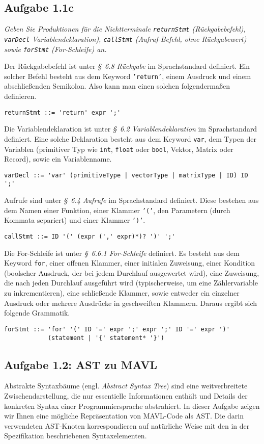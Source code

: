 \documentclass[
  ngerman,
  DIV=14
]{scrartcl}
\begin{document}
\subsection*{Aufgabe 1.1c}

\emph{Geben Sie Produktionen für die Nichtterminale \texttt{returnStmt} (Rückgabebefehl), \texttt{varDecl} Variablendeklaration), \texttt{callStmt} (Aufruf-Befehl, ohne Rückgabewert) sowie \texttt{forStmt} (For-Schleife) an.}

\bigskip\noindent
Der Rückgabebefehl ist unter \emph{§~6.8 Rückgabe} im Sprachstandard definiert. Ein solcher Befehl besteht aus dem Keyword \texttt{'return'}, einem Ausdruck und einem abschließenden Semikolon. Also kann man einen solchen folgendermaßen definieren.
\begin{lstlisting}
returnStmt ::= 'return' expr ';'
\end{lstlisting}
Die Variablendeklaration ist unter \emph{§~6.2 Variablendeklaration} im Sprachstandard definiert. Eine solche Deklaration besteht aus dem Keyword \texttt{var}, dem Typen der Variablen (primitiver Typ wie \texttt{int}, \texttt{float} oder \texttt{bool}, Vektor, Matrix oder Record), sowie ein Variablenname.
\begin{lstlisting}
varDecl ::= 'var' (primitiveType | vectorType | matrixType | ID) ID ';'  
\end{lstlisting}
Aufrufe sind unter \emph{§~6.4 Aufrufe} im Sprachstandard definiert. Diese bestehen aus dem Namen einer Funktion, einer Klammer \texttt{'('}, den Parametern (durch Kommata separiert) und einer Klammer \texttt{')'}.
\begin{lstlisting}
callStmt ::= ID '(' (expr (',' expr)*)? ')' ';'
\end{lstlisting}
Die For-Schleife ist unter \emph{§~6.6.1 For-Schleife} definiert. Es besteht aus dem Keyword \texttt{for}, einer offenen Klammer, einer initialen Zuweisung, einer Kondition (boolscher Ausdruck, der bei jedem Durchlauf ausgewertet wird), eine Zuweisung, die nach jeden Durchlauf ausgeführt wird (typischerweise, um eine Zählervariable zu inkrementieren), eine schließende Klammer, sowie entweder ein einzelner Ausdruck oder mehrere Ausdrücke in geschweiften Klammern. Daraus ergibt sich folgende Grammatik.
\begin{lstlisting}
forStmt ::= 'for' '(' ID '=' expr ';' expr ';' ID '=' expr ')'
            (statement | '{' statement* '}')
\end{lstlisting}

\subsection*{Aufgabe 1.2: AST zu MAVL}
Abstrakte Syntaxbäume (engl. \emph{Abstract Syntax Tree}) sind eine weitverbreitete Zwischendarstellung, die nur essentielle Informationen enthält und Details der konkreten Syntax einer Programmiersprache abstrahiert. In dieser Aufgabe zeigen wir Ihnen eine mögliche Repräsentation von MAVL-Code als AST. Die darin verwendeten AST-Knoten korrespondieren auf natürliche Weise mit den in der Spezifikation beschriebenen Syntaxelementen. 
\end{document}
